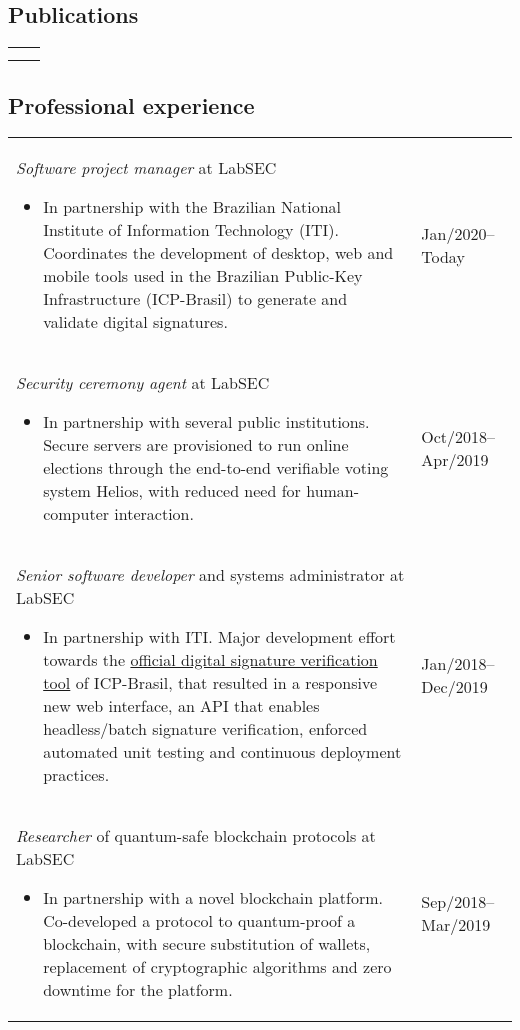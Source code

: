 \documentclass[12pt]{article}
\makeatletter
\newenvironment{datetable}
  {\newcolumntype{R}{>{\raggedleft\arraybackslash}p{0.14\textwidth}}
   \newcolumntype{L}{p{0.82\textwidth}}
   \begin{tabular}{@{\hspace{0mm}}LR}}
  {\end{tabular}}
\newenvironment{contenttable}[1]
  {\subsection*{#1}
   \begin{datetable}}
  {\end{datetable}}
\makeatother
\begin{document}
\begin{contenttable}{Publications}
  \hspace{0mm} \\
   \\
\end{contenttable}

\begin{contenttable}{Professional experience}
  \emph{Software project manager} at LabSEC
  \begin{itemize}
    \item In partnership with the Brazilian National Institute of Information
        Technology (ITI). Coordinates the development of desktop, web and
          mobile tools used in the Brazilian Public-Key Infrastructure
          (ICP-Brasil) to generate and validate digital signatures.
  \end{itemize} & Jan/2020--Today \\

  \emph{Security ceremony agent} at LabSEC
  \begin{itemize}
    \item In partnership with several public institutions. Secure servers are
        provisioned to run online elections through the end-to-end verifiable
          voting system Helios, with reduced need for human-computer
          interaction.
  \end{itemize} & Oct/2018--Apr/2019 \\

  \emph{Senior software developer} and systems administrator at LabSEC
  \begin{itemize}
    \item In partnership with ITI. Major development effort towards the
          \href{https://verificador.iti.gov.br}{official digital signature
          verification tool} of ICP-Brasil, that resulted in a responsive new
          web interface, an API that enables headless/batch signature
          verification, enforced automated unit testing and continuous
          deployment practices.
  \end{itemize} & Jan/2018--Dec/2019 \\

  \emph{Researcher} of quantum-safe blockchain protocols at LabSEC
  \begin{itemize}
    \item In partnership with a novel blockchain platform. Co-developed a
        protocol to quantum-proof a blockchain, with secure substitution of
          wallets, replacement of cryptographic algorithms and zero downtime
          for the platform.
  \end{itemize} & Sep/2018--Mar/2019 \\


\end{contenttable}
\end{document}
